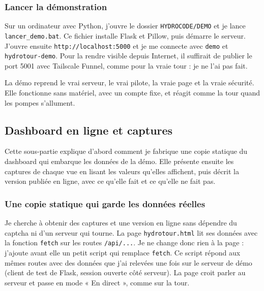 \subsubsection*{Lancer la démonstration}

Sur un ordinateur avec Python, j'ouvre le dossier \texttt{HYDROCODE/DEMO} et je lance \texttt{lancer\_demo.bat}. Ce fichier installe Flask et Pillow, puis démarre le serveur. J'ouvre ensuite \texttt{http://localhost:5000} et je me connecte avec \texttt{demo} et \texttt{hydrotour-demo}. Pour la rendre visible depuis Internet, il suffirait de publier le port 5001 avec Tailscale Funnel, comme pour la vraie tour : je ne l'ai pas fait.

\begin{aretenir}
La démo reprend le vrai serveur, le vrai pilote, la vraie page et la vraie sécurité. Elle fonctionne sans matériel, avec un compte fixe, et réagit comme la tour quand les pompes s'allument.
\end{aretenir}

\subsection{Dashboard en ligne et captures}

Cette sous-partie explique d'abord comment je fabrique une copie statique du dashboard qui embarque les données de la démo. Elle présente ensuite les captures de chaque vue en lisant les valeurs qu'elles affichent, puis décrit la version publiée en ligne, avec ce qu'elle fait et ce qu'elle ne fait pas.

\subsubsection*{Une copie statique qui garde les données réelles}

Je cherche à obtenir des captures et une version en ligne sans dépendre du captcha ni d'un serveur qui tourne. La page \texttt{hydrotour.html} lit ses données avec la fonction \texttt{fetch} sur les routes \texttt{/api/...}. Je ne change donc rien à la page : j'ajoute avant elle un petit script qui remplace \texttt{fetch}. Ce script répond aux mêmes routes avec des données que j'ai relevées une fois sur le serveur de démo (client de test de Flask, session ouverte côté serveur). La page croit parler au serveur et passe en mode « En direct », comme sur la tour.

